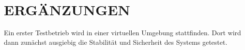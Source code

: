 	
	
	
	
	
	\section{\Large ERGÄNZUNGEN}
	Ein erster Testbetrieb wird in einer virtuellen Umgebung stattfinden. Dort wird dann zunächst ausgiebig die Stabilität und Sicherheit des Systems getestet.
	
	
